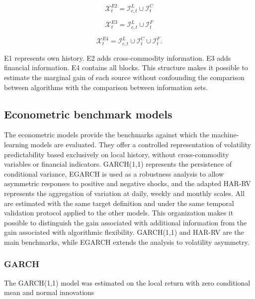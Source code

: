 \documentclass[a4paper,fleqn]{cas-sc}
\begin{document}
\begin{equation}
\mathcal{X}^{E2}_{t}=\mathcal{I}^{L}_{c,t}\cup\mathcal{I}^{C}_{t}
\label{eq:e2}
\end{equation}

\begin{equation}
\mathcal{X}^{E3}_{t}=\mathcal{I}^{L}_{c,t}\cup\mathcal{I}^{F}_{t}
\label{eq:e3}
\end{equation}

\begin{equation}
\mathcal{X}^{E4}_{t}=\mathcal{I}^{L}_{c,t}\cup\mathcal{I}^{C}_{t}\cup\mathcal{I}^{F}_{t}.
\label{eq:e4}
\end{equation}

E1 represents own history. E2 adds cross-commodity information. E3 adds financial information. E4 contains all blocks. This structure makes it possible to estimate the marginal gain of each source without confounding the comparison between algorithms with the comparison between information sets.

\subsection{Econometric benchmark models}
\label{subsec:econometric_models}

The econometric models provide the benchmarks against which the machine-learning models are evaluated. They offer a controlled representation of volatility predictability based exclusively on local history, without cross-commodity variables or financial indicators. GARCH(1,1) represents the persistence of conditional variance, EGARCH is used as a robustness analysis to allow asymmetric responses to positive and negative shocks, and the adapted HAR-RV represents the aggregation of variation at daily, weekly and monthly scales. All are estimated with the same target definition and under the same temporal validation protocol applied to the other models. This organization makes it possible to distinguish the gain associated with additional information from the gain associated with algorithmic flexibility. GARCH(1,1) and HAR-RV are the main benchmarks, while EGARCH extends the analysis to volatility asymmetry.

\subsubsection{GARCH}

The GARCH(1,1) model was estimated on the local return with zero conditional mean and normal innovations \citep{Bollerslev1986GARCH}
\end{document}
